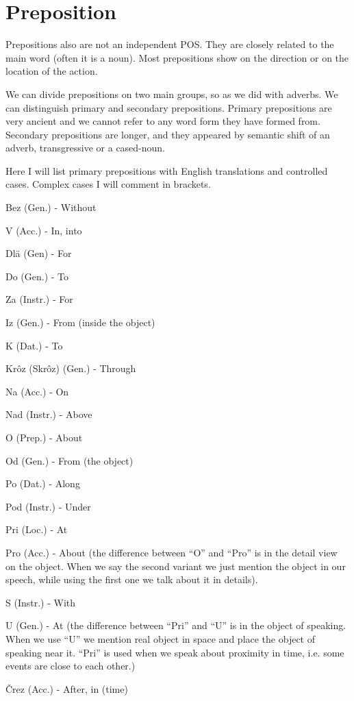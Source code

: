 \section{Preposition}

Prepositions also are not an independent POS. They are closely related to the main word (often it is a noun). Most prepositions show on the direction or on the location of the action. 

We can divide prepositions on two main groups, so as we did with adverbs. We can distinguish primary and secondary prepositions. Primary prepositions are very ancient and we cannot refer to any word form they have formed from. Secondary prepositions are longer, and they appeared by semantic shift of an adverb, transgressive or a cased-noun. 

Here I will list primary prepositions with English translations and controlled cases. Complex cases I will comment in brackets.

Bez (Gen.) - Without

V (Acc.) - In, into

Dlä (Gen) - For

Do (Gen.) - To

Za (Instr.) - For

Iz (Gen.) - From (inside the object)

K (Dat.) - To

Krôz (Skrôz) (Gen.) - Through

Na (Acc.) - On

Nad (Instr.) - Above

O (Prep.) - About

Od (Gen.) - From (the object)

Po (Dat.) - Along

Pod (Instr.) - Under

Pri (Loc.) - At

Pro (Acc.) - About (the difference between “O” and “Pro” is in the detail view on the object. When we say the second variant we just mention the object in our speech, while using the first one we talk about it in details).

S (Instr.) - With

U (Gen.) - At (the difference between “Pri” and “U” is in the object of speaking. When we use “U” we mention real object in space and place the object of speaking near it. “Pri” is used when we speak about proximity in time, i.e. some events are close to each other.)

Črez (Acc.) - After,  in (time)
